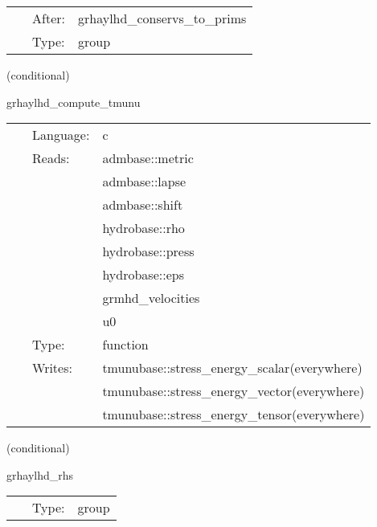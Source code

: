 \documentclass{article}
\begin{document}
\hspace{5mm}

 \begin{tabular*}{160mm}{cll} 
~ & After:  & grhaylhd\_conservs\_to\_prims \\ 
~ & Type:  & group \\ 
\end{tabular*} 


\vspace{5mm}

   (conditional) 

\hspace{5mm} grhaylhd\_compute\_tmunu 

\hspace{5mm}{\it compute stress-energy tensor } 


\hspace{5mm}

 \begin{tabular*}{160mm}{cll} 
~ & Language:  & c \\ 
~ & Reads:  & admbase::metric \\ 
~& ~ &admbase::lapse\\ 
~& ~ &admbase::shift\\ 
~& ~ &hydrobase::rho\\ 
~& ~ &hydrobase::press\\ 
~& ~ &hydrobase::eps\\ 
~& ~ &grmhd\_velocities\\ 
~& ~ &u0\\ 
~ & Type:  & function \\ 
~ & Writes:  & tmunubase::stress\_energy\_scalar(everywhere) \\ 
~& ~ &tmunubase::stress\_energy\_vector(everywhere)\\ 
~& ~ &tmunubase::stress\_energy\_tensor(everywhere)\\ 
\end{tabular*} 


\vspace{5mm}

   (conditional) 

\hspace{5mm} grhaylhd\_rhs 

\hspace{5mm}{\it evaluate rhss grhd equations } 


\hspace{5mm}

 \begin{tabular*}{160mm}{cll} 
~ & Type:  & group \\ 
\end{tabular*} 
\end{document}
